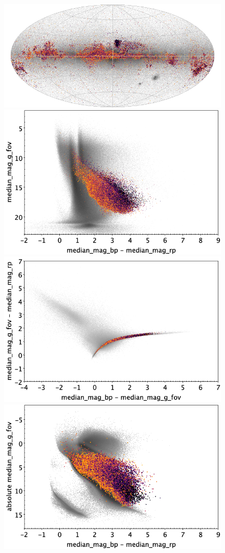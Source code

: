 \documentclass[longauth]{aa}
\begin{document}
\begin{appendix}
\begin{figure}
\centering
{}
\includegraphics[width=0.6\hsize]{figures/appendix/YSO_cls_sky.png} 
 \\ %
\vspace{4mm}
 \includegraphics[width=0.45\hsize]{figures/appendix/YSO_cls_cm.png}  %
\hspace{2mm}
 \includegraphics[width=0.45\hsize]{figures/appendix/YSO_cls_cc.png} \\ %
\vspace{4mm}
 \includegraphics[width=0.45\hsize]{figures/appendix/YSO_cls_cam.png}  %

\end{figure}
\end{appendix}
\end{document}
